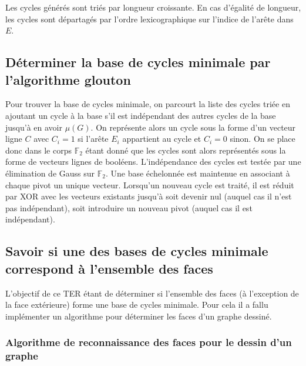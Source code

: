 \documentclass{article}
\begin{document}
Les cycles générés sont triés par longueur croissante. En cas d'égalité de longueur, les cycles sont départagés par l'ordre lexicographique sur l'indice de l'arête dans $E$.

\subsection{Déterminer la base de cycles minimale par l'algorithme glouton}

Pour trouver la base de cycles minimale, on parcourt la liste des cycles triée en ajoutant un cycle à la base s'il est indépendant des autres cycles de la base jusqu'à en avoir $\mu(G)$. On représente alors un cycle sous la forme d'un vecteur ligne $C$ avec $C_i = 1$ si l'arête $E_i$ appartient au cycle et $C_i = 0$ sinon. On se place donc dans le corps $\mathbb{F}_2$ étant donné que les cycles sont alors représentés sous la forme de vecteurs lignes de booléens. L’indépendance des cycles est testée par une élimination de Gauss sur $\mathbb{F}_2$. Une base échelonnée est maintenue en associant à chaque pivot un unique vecteur. Lorsqu’un nouveau cycle est traité, il est réduit par XOR avec les vecteurs existants jusqu’à soit devenir nul (auquel cas il n'est pas indépendant), soit introduire un nouveau pivot (auquel cas il est indépendant).

\subsection{Savoir si une des bases de cycles minimale correspond à l'ensemble des faces}

L'objectif de ce TER étant de déterminer si l'ensemble des faces (à l’exception de la face extérieure) forme une base de cycles minimale. Pour cela il a fallu implémenter un algorithme pour déterminer les faces d'un graphe dessiné.

\subsubsection{Algorithme de reconnaissance des faces pour le dessin d'un graphe}
\end{document}
